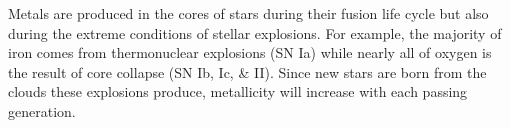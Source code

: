 \documentclass{emulateapj}
\begin{document}
Metals are produced in the cores of stars during their fusion life cycle but also during the extreme conditions of stellar explosions. For example, the majority of iron comes from thermonuclear explosions (SN Ia) while nearly all of oxygen is the result of core collapse (SN Ib, Ic, \& II). Since new stars are born from the clouds these explosions produce, metallicity will increase with each passing generation. 
\end{document}

